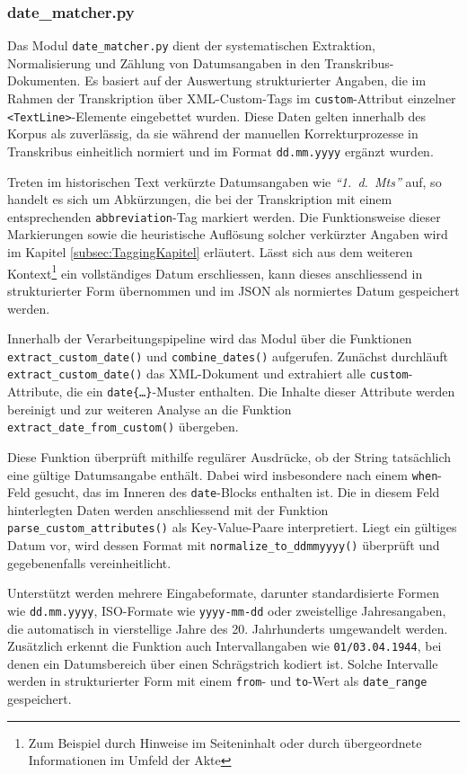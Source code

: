 \documentclass[12pt, a4paper, ngerman, bidi=default]{article}
\begin{document}
\subsubsection*{date\_matcher.py}\label{subsection:date\_matcher}
Das Modul \texttt{date\_matcher.py} dient der systematischen Extraktion, Normalisierung und 
Zählung von Datumsangaben in den Transkribus-Dokumenten. Es basiert auf der 
Auswertung strukturierter Angaben, die im Rahmen der Transkription über XML-Custom-Tags im 
\texttt{custom}-Attribut einzelner \texttt{<TextLine>}-Elemente eingebettet wurden. Diese 
Daten gelten innerhalb des Korpus als zuverlässig, da sie während der manuellen Korrekturprozesse
in Transkribus einheitlich normiert und im Format \texttt{dd.mm.yyyy} ergänzt wurden.

Treten im historischen Text verkürzte Datumsangaben wie \textit{\enquote{1.~d.~Mts}} auf, so handelt
es sich um Abkürzungen, die bei der Transkription mit einem entsprechenden \texttt{abbreviation}-Tag
markiert werden. Die Funktionsweise dieser Markierungen sowie die heuristische Auflösung solcher 
verkürzter Angaben wird im Kapitel \ref{subsec:TaggingKapitel} erläutert. Lässt sich aus dem weiteren 
Kontext\footnote{Zum Beispiel durch Hinweise im Seiteninhalt oder durch übergeordnete Informationen im Umfeld der Akte} 
ein vollständiges Datum erschliessen, kann dieses anschliessend in strukturierter Form übernommen und im JSON als 
normiertes Datum gespeichert werden.

Innerhalb der Verarbeitungspipeline wird das Modul über die Funktionen \texttt{extract\_custom\_date()} und 
\texttt{combine\_dates()} aufgerufen. Zunächst durchläuft \texttt{extract\_custom\_date()} das XML-Dokument 
und extrahiert alle \texttt{custom}-Attribute, die ein \texttt{date\{…\}}-Muster enthalten. Die Inhalte dieser 
Attribute werden bereinigt und zur weiteren Analyse an die Funktion \texttt{extract\_date\_from\_custom()} übergeben.

Diese Funktion überprüft mithilfe regulärer Ausdrücke, ob der String tatsächlich eine gültige Datumsangabe enthält. 
Dabei wird insbesondere nach einem \texttt{when}-Feld gesucht, das im Inneren des \texttt{date}-Blocks enthalten ist. 
Die in diesem Feld hinterlegten Daten werden anschliessend mit der Funktion \texttt{parse\_custom\_attributes()} als 
Key-Value-Paare interpretiert. Liegt ein gültiges Datum vor, wird dessen Format mit \texttt{normalize\_to\_ddmmyyyy()} 
überprüft und gegebenenfalls vereinheitlicht.

Unterstützt werden mehrere Eingabeformate, darunter standardisierte Formen wie \texttt{dd.mm.yyyy}, ISO-Formate 
wie \texttt{yyyy-mm-dd} oder zweistellige Jahresangaben, die automatisch in vierstellige Jahre des 20.
Jahrhunderts umgewandelt werden. Zusätzlich erkennt die Funktion auch Intervallangaben wie \texttt{01/03.04.1944}, 
bei denen ein Datumsbereich über einen Schrägstrich kodiert ist. Solche Intervalle werden in strukturierter Form mit 
einem \texttt{from}- und \texttt{to}-Wert als \texttt{date\_range} gespeichert.
\end{document}
